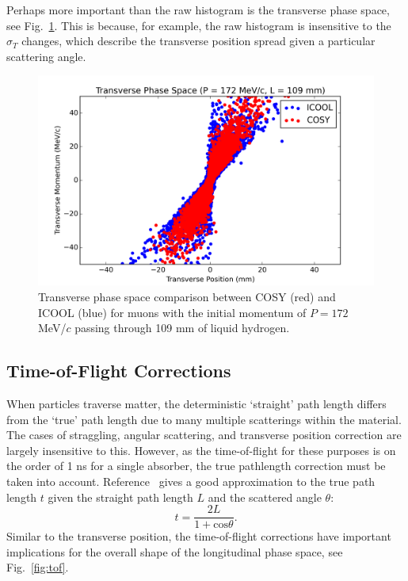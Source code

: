 \documentclass[a4paper,11pt]{article}
\begin{document}
Perhaps more important than the raw histogram is the transverse phase space, see Fig.~\ref{fig:transverse_phase_space}. This is because, for example, the raw histogram is insensitive to the $\sigma_T$ changes, which describe the transverse position spread given a particular scattering angle.

\begin{figure}[htb]
\centering
\includegraphics[width=\columnwidth]{Figures/transverse_phase_space}
\caption{Transverse phase space comparison between COSY (red) and ICOOL (blue) for muons with the initial momentum of $P=172$ MeV/$c$ passing through 109 mm of liquid hydrogen.}
\label{fig:transverse_phase_space}
\end{figure}

\subsection{Time-of-Flight Corrections}
When particles traverse matter, the deterministic `straight' path length differs from the `true' path length due to many multiple scatterings within the material. The cases of straggling, angular scattering, and transverse position correction are largely insensitive to this. However, as the time-of-flight for these purposes is on the order of 1 ns for a single absorber, the true pathlength correction must be taken into account. Reference~\cite{Bielajew} gives a good approximation to the true path length $t$ given the straight path length $L$ and the scattered angle $\theta$:
\[
t = \frac{2L}{1+\text{cos}\theta}.
\]
Similar to the transverse position, the time-of-flight corrections have important implications for the overall shape of the longitudinal phase space, see Fig.~\ref{fig:tof}.
\end{document}
